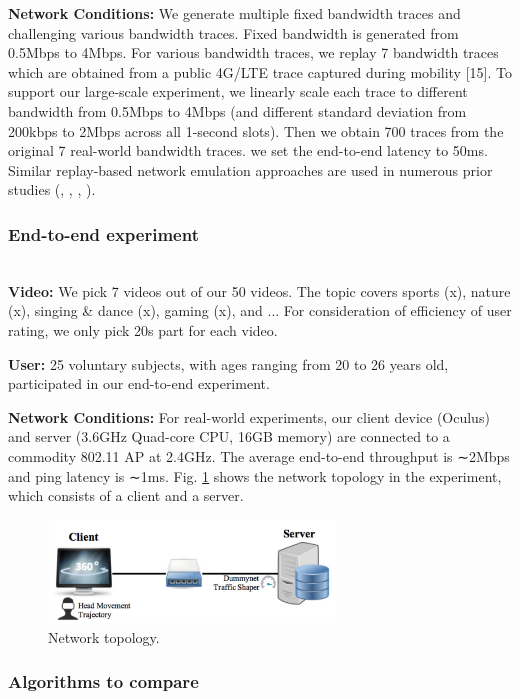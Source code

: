 \textbf{Network Conditions: } We generate multiple fixed bandwidth traces and challenging various bandwidth traces. Fixed bandwidth is generated from 0.5Mbps to 4Mbps. For various bandwidth traces, we replay 7 bandwidth traces which are obtained from a public 4G/LTE trace captured during mobility [15]. To support our large-scale experiment, we linearly scale each trace to different bandwidth from 0.5Mbps to 4Mbps (and different standard deviation from 200kbps to 2Mbps across all 1-second slots). Then we obtain 700 traces from the original 7 real-world bandwidth traces. we set the end-to-end latency to 50ms. Similar replay-based network emulation approaches are used in numerous prior studies (\cite{bandwidth1}, \cite{bandwidth2}, \cite{bandwidth3}, \cite{Flare}).

\subsubsection{End-to-end experiment}
~\\

\textbf{Video: } We pick 7 videos out of our 50 videos. The topic covers sports (x), nature (x), singing \& dance (x), gaming (x), and ... For consideration of efficiency of user rating, we only pick 20s part for each video.

\textbf{User: } 25 voluntary subjects, with ages ranging from 20 to 26 years old, participated in our end-to-end experiment.

\textbf{Network Conditions: } For real-world experiments, our client device (Oculus) and server (3.6GHz Quad-core CPU, 16GB memory) are connected to a commodity 802.11 AP at 2.4GHz. The average end-to-end throughput is ∼2Mbps and ping latency is ∼1ms. Fig. \ref{network} shows the network topology in the experiment, which consists of a client and a server.

\begin{figure}
  \centering
  \includegraphics[width=3in]{images/network.jpg}
  \caption{Network topology.}
  \label{network}
  \end{figure}

\subsubsection{Algorithms to compare}
~\\

